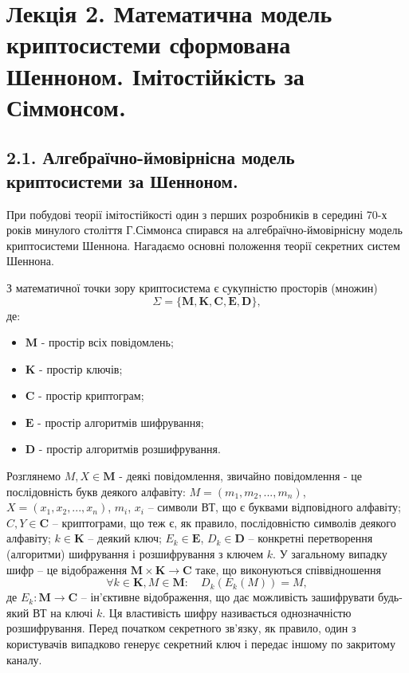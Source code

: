 \section{Лекція 2. Математична модель криптосистеми сформована Шенноном. Імітостійкість за Сіммонсом.}

\subsection{2.1. Алгебраїчно-ймовірнісна модель криптосистеми за Шенноном.}

При побудові теорії імітостійкості один з перших розробників в середині
70-х років минулого століття Г.Сіммонса спирався на алгебраїчно-ймовірнісну
модель криптосистеми Шеннона. Нагадаємо основні положення теорії
секретних систем Шеннона.

З математичної точки зору криптосистема є сукупністю просторів (множин) 
\begin{equation*}
    \Sigma = \{\mathbf{M}, \mathbf{K}, \mathbf{C}, \mathbf{E}, \mathbf{D}\},
\end{equation*}
де:
\begin{itemize}
    \item $\mathbf{M}$ - простір всіх повідомлень;
    \item $\mathbf{K}$ - простір ключів;
    \item $\mathbf{C}$ - простір криптограм;
    \item $\mathbf{E}$ - простір алгоритмів шифрування;
    \item $\mathbf{D}$ - простір алгоритмів розшифрування.
\end{itemize}


Розглянемо $M, X \in \mathbf{M}$ - деякі повідомлення, звичайно повідомлення - це
послідовність букв деякого алфавіту: $M = (m_1, m_2, ..., m_n)$, $X = (x_1, x_2, ..., x_n)$, $m_i$, $x_i$
-- символи ВТ, що є буквами відповідного алфавіту;
$C, Y \in \mathbf{C}$ -- криптограми, що
теж є, як правило, послідовністю символів деякого алфавіту;
$k \in \mathbf{K}$ -- деякий ключ;
$E_k \in \mathbf{E}$, $D_k \in \mathbf{D}$ -- конкретні перетворення (алгоритми) шифрування і
розшифрування з ключем $k$.
У загальному випадку шифр -- це відображення $\mathbf{M} \times \mathbf{K} \rightarrow \mathbf{C}$ таке, що виконуються співвідношення
$$\forall k \in \mathbf{K}, M \in \mathbf{M}: \quad D_k(E_k(M)) = M,$$
де $E_k: \mathbf{M} \rightarrow \mathbf{C}$ -- ін'єктивне відображення, що дає можливість зашифрувати
будь-який ВТ на ключі $k$. Ця властивість шифру називається однозначністю
розшифрування. Перед початком секретного зв’язку, як правило, один з
користувачів випадково генерує секретний ключ і передає іншому по закритому
каналу.

